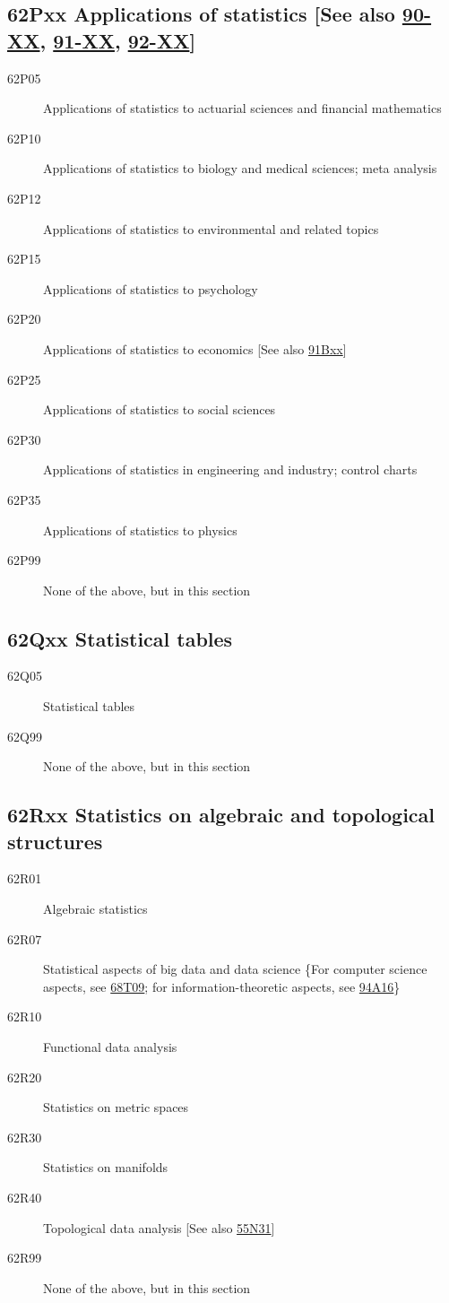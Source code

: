 \documentclass[letterpaper]{article}
\begin{document}
\subsection*{62Pxx  Applications of statistics [See also \hyperref[90-XX]{90-XX}, \hyperref[91-XX]{91-XX}, \hyperref[92-XX]{92-XX}] }\label{62Pxx}
\begin{description}  
\item [62P05]\label{62P05} Applications of statistics to actuarial sciences and financial mathematics
\item [62P10]\label{62P10} Applications of statistics to biology and medical sciences; meta analysis
\item [62P12]\label{62P12} Applications of statistics to environmental and related topics
\item [62P15]\label{62P15} Applications of statistics to psychology
\item [62P20]\label{62P20} Applications of statistics to economics [See also \hyperref[91Bxx]{91Bxx}]
\item [62P25]\label{62P25} Applications of statistics to social sciences
\item [62P30]\label{62P30} Applications of statistics in engineering and industry; control charts
\item [62P35]\label{62P35} Applications of statistics to physics
\item [62P99]\label{62P99} None of the above, but in this section
\end{description}
\subsection*{62Qxx  Statistical tables }\label{62Qxx}
\begin{description}  
\item [62Q05]\label{62Q05} Statistical tables
\item [62Q99]\label{62Q99} None of the above, but in this section
\end{description}
\subsection*{62Rxx  Statistics on algebraic and topological structures }\label{62Rxx}
\begin{description}
\item [62R01]\label{62R01} Algebraic statistics
\item [62R07]\label{62R07} Statistical aspects of  big data and data science \{For computer science aspects, see \hyperref[68T09]{68T09}; for information-theoretic aspects, see \hyperref[94A16]{94A16}\}
\item [62R10]\label{62R10} Functional data analysis
\item [62R20]\label{62R20} Statistics on metric spaces
\item [62R30]\label{62R30} Statistics on manifolds
\item [62R40]\label{62R40} Topological data analysis [See also \hyperref[55N31]{55N31}]
\item [62R99]\label{62R99} None of the above, but in this section
\end{description}
\end{document}
